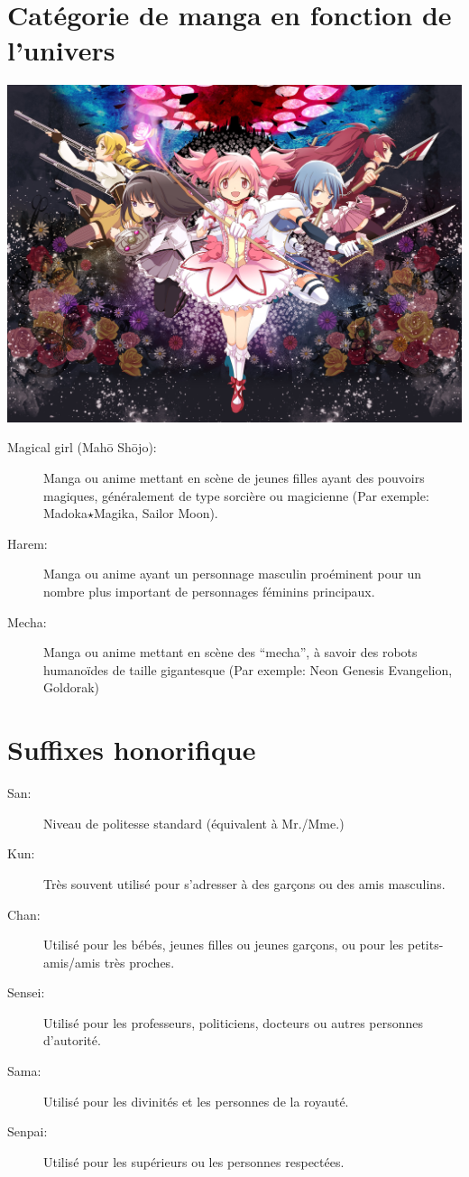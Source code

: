 \section[Univers]{Catégorie de manga en fonction de l'univers}

\begin{center}
	\includegraphics[scale=0.8]{Madoka.jpg}
\end{center}

\begin{description}
	\item[Magical girl (Mah\=o Sh\=ojo):] Manga ou anime mettant en scène de
		jeunes filles ayant des pouvoirs magiques, généralement de type
		sorcière ou magicienne (Par exemple: Madoka$\star$Magika, Sailor Moon).
	\item[Harem:] Manga ou anime ayant un personnage masculin proéminent pour
		un nombre plus important de personnages féminins principaux.
	\item[Mecha:] Manga ou anime mettant en scène des ``mecha'', à savoir des
		robots humanoïdes de taille gigantesque (Par exemple: Neon Genesis
		Evangelion, Goldorak)
\end{description}

\section{Suffixes honorifique}

\begin{description}
	\item[San:] Niveau de politesse standard (équivalent à Mr./Mme.)
	\item[Kun:] Très souvent utilisé pour s'adresser à des garçons ou des amis
		masculins.
	\item[Chan:] Utilisé pour les bébés, jeunes filles ou jeunes garçons, ou
		pour les petits-amis/amis très proches.
	\item[Sensei:] Utilisé pour les professeurs, politiciens, docteurs ou
		autres personnes d'autorité.
	\item[Sama:] Utilisé pour les divinités et les personnes de la royauté.
	\item[Senpai:] Utilisé pour les supérieurs ou les personnes respectées.
\end{description}

